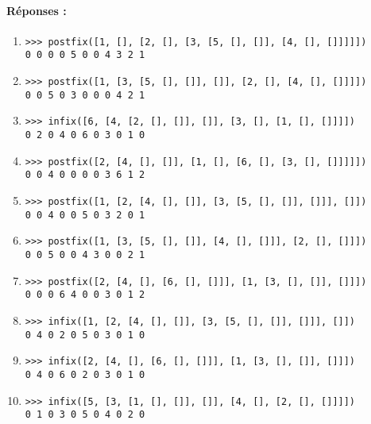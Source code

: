 \documentclass[11pt,a4paper]{article}
\begin{document}
\paragraph{Réponses :} 
\begin{enumerate}
\item \texttt{>{>}> postfix([1, [], [2, [], [3, [5, [], []], [4, [], []]]]])}\\
\texttt{0 0 0 0 5 0 0 4 3 2 1 }

\item \texttt{>{>}> postfix([1, [3, [5, [], []], []], [2, [], [4, [], []]]])}\\
\texttt{0 0 5 0 3 0 0 0 4 2 1 }

\item \texttt{>{>}> infix([6, [4, [2, [], []], []], [3, [], [1, [], []]]])}\\
\texttt{0 2 0 4 0 6 0 3 0 1 0 }

\item \texttt{>{>}> postfix([2, [4, [], []], [1, [], [6, [], [3, [], []]]]])}\\
\texttt{0 0 4 0 0 0 0 3 6 1 2 }

\item \texttt{>{>}> postfix([1, [2, [4, [], []], [3, [5, [], []], []]], []])}\\
\texttt{0 0 4 0 0 5 0 3 2 0 1 }

\item \texttt{>{>}> postfix([1, [3, [5, [], []], [4, [], []]], [2, [], []]])}\\
\texttt{0 0 5 0 0 4 3 0 0 2 1 }

\item \texttt{>{>}> postfix([2, [4, [], [6, [], []]], [1, [3, [], []], []]])}\\
\texttt{0 0 0 6 4 0 0 3 0 1 2 }

\item \texttt{>{>}> infix([1, [2, [4, [], []], [3, [5, [], []], []]], []])}\\
\texttt{0 4 0 2 0 5 0 3 0 1 0 }

\item \texttt{>{>}> infix([2, [4, [], [6, [], []]], [1, [3, [], []], []]])}\\
\texttt{0 4 0 6 0 2 0 3 0 1 0 }

\item \texttt{>{>}> infix([5, [3, [1, [], []], []], [4, [], [2, [], []]]])}\\
\texttt{0 1 0 3 0 5 0 4 0 2 0 }


\end{enumerate}
\end{document}

